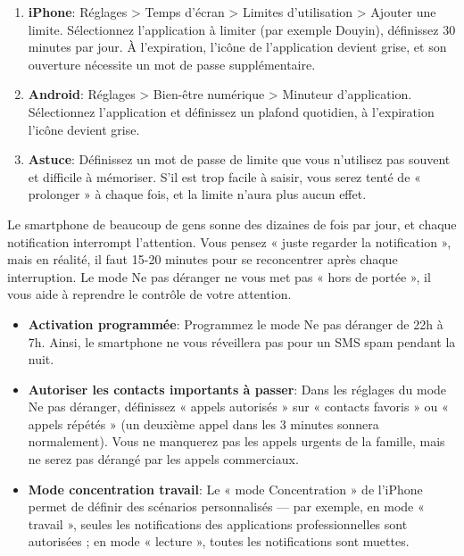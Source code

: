\begin{enumerate}
  \item \textbf{iPhone}: Réglages > Temps d'écran > Limites d'utilisation > Ajouter une limite. Sélectionnez l'application à limiter (par exemple Douyin), définissez 30 minutes par jour. À l'expiration, l'icône de l'application devient grise, et son ouverture nécessite un mot de passe supplémentaire.
  \item \textbf{Android}: Réglages > Bien-être numérique > Minuteur d'application. Sélectionnez l'application et définissez un plafond quotidien, à l'expiration l'icône devient grise.
  \item \textbf{Astuce}: Définissez un mot de passe de limite que vous n'utilisez pas souvent et difficile à mémoriser. S'il est trop facile à saisir, vous serez tenté de « prolonger » à chaque fois, et la limite n'aura plus aucun effet.
\end{enumerate}


Le smartphone de beaucoup de gens sonne des dizaines de fois par jour, et chaque notification interrompt l'attention. Vous pensez « juste regarder la notification », mais en réalité, il faut 15-20 minutes pour se reconcentrer après chaque interruption. Le mode Ne pas déranger ne vous met pas « hors de portée », il vous aide à reprendre le contrôle de votre attention.

\begin{itemize}
  \item \textbf{Activation programmée}: Programmez le mode Ne pas déranger de 22h à 7h. Ainsi, le smartphone ne vous réveillera pas pour un SMS spam pendant la nuit.
  \item \textbf{Autoriser les contacts importants à passer}: Dans les réglages du mode Ne pas déranger, définissez « appels autorisés » sur « contacts favoris » ou « appels répétés » (un deuxième appel dans les 3 minutes sonnera normalement). Vous ne manquerez pas les appels urgents de la famille, mais ne serez pas dérangé par les appels commerciaux.
  \item \textbf{Mode concentration travail}: Le « mode Concentration » de l'iPhone permet de définir des scénarios personnalisés — par exemple, en mode « travail », seules les notifications des applications professionnelles sont autorisées ; en mode « lecture », toutes les notifications sont muettes.
\end{itemize}


